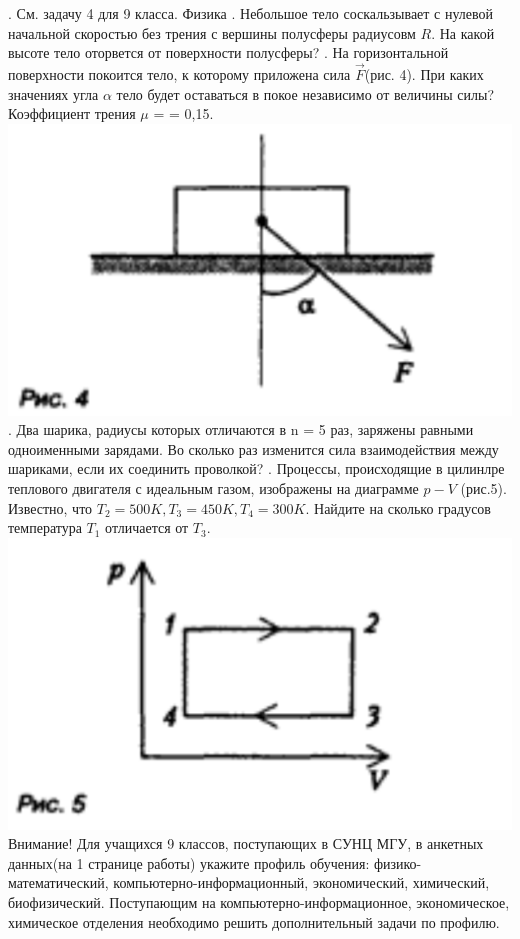 \begin{multicols*}{3}
. См. задачу 4 для 9 класса.
\indent Физика
. Небольшое тело соскальзывает с нулевой начальной скоростью без трения с вершины полусферы радиусовм $R$. На какой высоте тело оторвется от поверхности полусферы?
. На горизонтальной поверхности покоится тело, к которому приложена сила $\Vec{F}$(рис. 4). При каких значениях угла $\alpha$ тело будет оставаться в покое независимо от величины силы? Коэффициент трения $\mu$ = = 0,15.
\includegraphics[scale=0.3]{images/image4.png}
. Два шарика, радиусы которых отличаются в n = 5 раз, заряжены равными одноименными зарядами. Во сколько раз изменится сила взаимодействия между шариками, если их соединить проволкой?
. Процессы, происходящие в цилинлре теплового двигателя с идеальным
\columnbreak
\noindent \small газом, изображены на диаграмме $p - V$ (рис.5). Известно, что $T_2 = 500 K, T_3 = 450 K, T_4 = 300 K$. Найдите на сколько градусов температура $T_1$ отличается от $T_3$.
\includegraphics[scale=0.25]{images/image5.png}
\indent Внимание! Для учащихся 9 классов, поступающих в СУНЦ МГУ, в анкетных данных(на 1 странице работы) укажите профиль обучения: физико-математический, компьютерно-информационный, экономический, химический, биофизический. Поступающим на компьютерно-информационное, экономическое, химическое отделения необходимо решить дополнительный задачи по профилю.

\end{multicols*}
